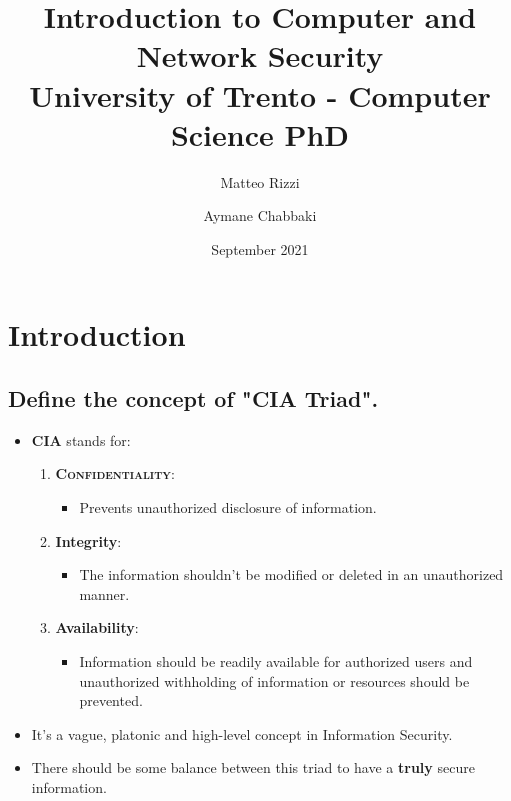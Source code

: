 \documentclass[9pt, letterpaper]{article}
\title{%
  Introduction to Computer and Network Security \\
  \large University of Trento - Computer Science PhD}
\author{Matteo Rizzi \and Aymane Chabbaki}
\date{September 2021}
\begin{document}
\graphicspath{ {img/} }
\begin{titlepage}
	\maketitle
	\tableofcontents
\end{titlepage}

\section{Introduction}

\subsection{Define the concept of "CIA Triad".}
\begin{itemize}
	\item \textbf{CIA} stands for: 
	\begin{enumerate}
		\item \textbf{\textsc{Confidentiality}}: 
		\begin{itemize}
			\item Prevents unauthorized disclosure of information.
		\end{itemize}				
		\item \textbf{Integrity}:
		\begin{itemize}
			\item The information shouldn't be modified or deleted in an unauthorized manner.
		\end{itemize}
		\item \textbf{Availability}:
		\begin{itemize}
			\item Information should be readily available for authorized users and unauthorized withholding of information or resources should be prevented.
		\end{itemize}
	\end{enumerate}
	\item It's a vague, platonic and high-level concept in Information Security. 
	\item 	There should be some balance between this triad to have a \textbf{truly} secure information.
\end{itemize}
\end{document}
